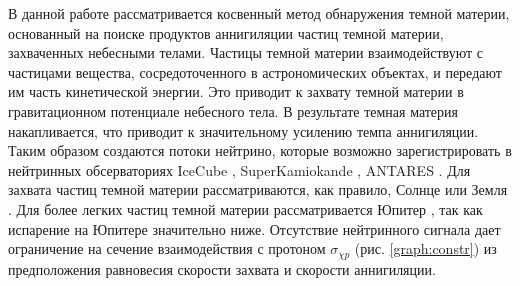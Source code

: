 В данной работе рассматривается косвенный метод обнаружения темной материи, основанный на поиске продуктов аннигиляции частиц темной материи, захваченных небесными телами. Частицы темной материи взаимодействуют с частицами вещества, сосредоточенного в астрономических объектах, и передают им часть кинетической энергии. Это приводит к захвату темной материи в гравитационном потенциале небесного тела. В результате темная материя накапливается, что приводит к значительному усилению темпа аннигиляции. Таким образом создаются потоки нейтрино, которые возможно зарегистрировать в нейтринных обсерваториях  IceCube \cite{Aartsen_2017}, SuperKamiokande \cite{kamiokandecollaboration2015search}, ANTARES \cite{ADRIANMARTINEZ201669}. Для захвата частиц темной материи рассматриваются, как правило, Солнце \cite{1985ApJ...296..679P} или Земля \cite{1987ApJ...321..571G}. Для более легких частиц темной материи рассматривается Юпитер \cite{French_2022}, так как испарение на Юпитере значительно ниже. Отсутствие нейтринного сигнала дает ограничение на сечение взаимодействия с протоном $\sigma_{\chi p}$ (рис. \ref{graph:constr}) из предположения равновесия скорости захвата и скорости аннигиляции. 

